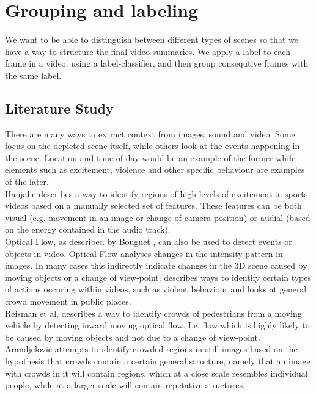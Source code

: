 %
\chapter{Grouping and labeling}
%
We want to be able to distinguish between different types of scenes so that we have a way to structure the final video summaries. We apply a label to each frame in a video, using a label-classifier, and then group consequtive frames with the same label.
%
\section{Literature Study}
%
There are many ways to extract context from images, sound and video. Some focus on the depicted scene itself, while others look at the events happening in the scene. Location and time of day would be an example of the former while elements such as excitement, violence and other specific behaviour are examples of the later.\\
Hanjalic\cite{citeulike:405480} describes a way to identify regions of high levels of excitement in sports videos based on a manually selected set of features. These features can be both visual (e.g. movement in an image or change of camera position) or audial (based on the energy contained in the audio track).\\
Optical Flow, as described by Bouguet \cite{Bouguet2000}, can also be used to detect events or objects in video. Optical Flow analyses changes in the intensity pattern in images. In many cases this indirectly indicate changes in the 3D scene caused by moving objects or a change of view-point. \cite{mangler} describes ways to identify certain types of actions occuring within videos, such as violent behaviour and \cite{mangler} looks at general crowd movement in public places.\\
Reisman et al. \cite{CrowdDetectionInVideoSequences} describes a way to identify crowds of pedestrians from a moving vehicle by detecting inward moving optical flow. I.e. flow which is highly likely to be caused by moving objects and not due to a change of view-point.\\
Arandjelović \cite{Arandjelovic08crowddetection} attempts to identify crowded regions in still images based on the hypothesis that crowds contain a certain general structure, namely that an image with crowds in it will contain regions, which at a close scale resembles individual people, while at a larger scale will contain repetative structures.\\
